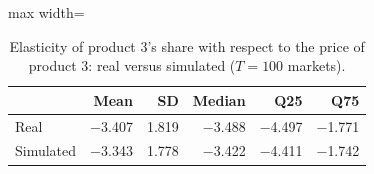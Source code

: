 \begin{table}[H]
\centering\small
\caption{Elasticity of product 3's share with respect to the price of product 3: real versus simulated ($T=100$ markets).}\label{tab:q8d_cell_33}
\begin{adjustbox}{max width=\linewidth}
\begin{tabular}{lrrrrr}
\toprule
 & Mean & SD & Median & Q25 & Q75 \\
\midrule
Real & $-$3.407 & 1.819 & $-$3.488 & $-$4.497 & $-$1.771 \\
Simulated & $-$3.343 & 1.778 & $-$3.422 & $-$4.411 & $-$1.742 \\
\bottomrule
\end{tabular}
\end{adjustbox}
\par\vspace{3pt}{\footnotesize Element $(3,3)$ of the elasticity matrix $\partial s_j/\partial p_k\cdot p_k/s_j$ across the 100 markets; simulated uses the Q8c estimates, real uses the true parameters.}
\end{table}
